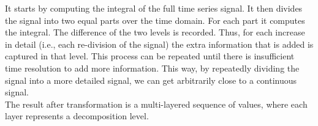 It starts by computing the integral of the full time series signal. It then
divides the signal into two equal parts over the time domain.
For each part it computes the integral. The difference of the two levels is
recorded. Thus, for each increase in detail (i.e., each re-division of the
signal) the extra information that is added is captured in that level. This
process can be repeated until there is insufficient time resolution to add more
information. This way, by repeatedly dividing the signal into a more detailed
signal, we can get arbitrarily close to a continuous signal.\\

The result after transformation is a multi-layered sequence of values, where
each layer represents a decomposition level.

\begin{comment}
This chapter contains all the information needed to put the thesis into
context. It is common to use (a revised version) of your literature survey for
this purpose.
It is important to refer from your text to sources you have used, as listed in
your bibliography section (appendix). For example, “XP is a recent agile
development method [1]” is a common style of doing this, where the following
entry would be included in your bibliography:
[1] K. Beck, E. Gamma, Test infected: Programmers love writing tests, Java
Report 3 (7) (1998) 51–56.
If you want to refer to books you have read as part of the curriculum, you can
also do so in this way.
Have a look at Chapter 2 of this example thesis at Paul’s
homepage\footnote{http://homepages.cwi.nl/~paulk/thesesMasterSoftwareEngineering/2006/RichardKettelerij.pdf}.
\end{comment}
